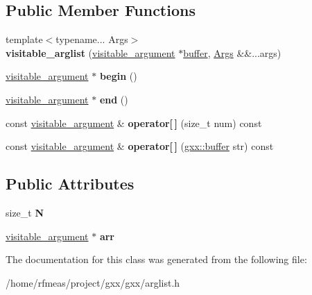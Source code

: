 \subsection*{Public Member Functions}
\begin{DoxyCompactItemize}
\item 
{\footnotesize template$<$typename... Args$>$ }\\{\bfseries visitable\+\_\+arglist} (\hyperlink{structgxx_1_1visitable__argument}{visitable\+\_\+argument} $\ast$\hyperlink{classgxx_1_1buffer}{buffer}, \hyperlink{structArgs}{Args} \&\&...args)\hypertarget{classgxx_1_1visitable__arglist_a6cffa20ae68694f03327e5b85c66f6b9}{}\label{classgxx_1_1visitable__arglist_a6cffa20ae68694f03327e5b85c66f6b9}

\item 
\hyperlink{structgxx_1_1visitable__argument}{visitable\+\_\+argument} $\ast$ {\bfseries begin} ()\hypertarget{classgxx_1_1visitable__arglist_ab95cf2976a074f0d89309017f2083843}{}\label{classgxx_1_1visitable__arglist_ab95cf2976a074f0d89309017f2083843}

\item 
\hyperlink{structgxx_1_1visitable__argument}{visitable\+\_\+argument} $\ast$ {\bfseries end} ()\hypertarget{classgxx_1_1visitable__arglist_a5d354f9ce4b26047c3cb233ad5b2e9b5}{}\label{classgxx_1_1visitable__arglist_a5d354f9ce4b26047c3cb233ad5b2e9b5}

\item 
const \hyperlink{structgxx_1_1visitable__argument}{visitable\+\_\+argument} \& {\bfseries operator\mbox{[}$\,$\mbox{]}} (size\+\_\+t num) const \hypertarget{classgxx_1_1visitable__arglist_ab9e247c68c52c96828889794e55bbf7a}{}\label{classgxx_1_1visitable__arglist_ab9e247c68c52c96828889794e55bbf7a}

\item 
const \hyperlink{structgxx_1_1visitable__argument}{visitable\+\_\+argument} \& {\bfseries operator\mbox{[}$\,$\mbox{]}} (\hyperlink{classgxx_1_1buffer}{gxx\+::buffer} str) const \hypertarget{classgxx_1_1visitable__arglist_ae9247e69d23f9ac999b172bfe0bf2c20}{}\label{classgxx_1_1visitable__arglist_ae9247e69d23f9ac999b172bfe0bf2c20}

\end{DoxyCompactItemize}
\subsection*{Public Attributes}
\begin{DoxyCompactItemize}
\item 
size\+\_\+t {\bfseries N}\hypertarget{classgxx_1_1visitable__arglist_af1fafafa1a38e49d2a5fb201c270f843}{}\label{classgxx_1_1visitable__arglist_af1fafafa1a38e49d2a5fb201c270f843}

\item 
\hyperlink{structgxx_1_1visitable__argument}{visitable\+\_\+argument} $\ast$ {\bfseries arr}\hypertarget{classgxx_1_1visitable__arglist_a13ac344b00d8c61ac5f64bdc466e25fb}{}\label{classgxx_1_1visitable__arglist_a13ac344b00d8c61ac5f64bdc466e25fb}

\end{DoxyCompactItemize}


The documentation for this class was generated from the following file\+:\begin{DoxyCompactItemize}
\item 
/home/rfmeas/project/gxx/gxx/arglist.\+h\end{DoxyCompactItemize}
